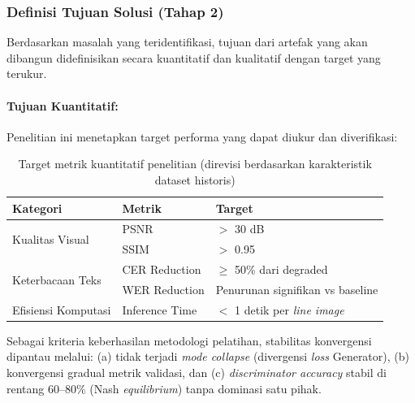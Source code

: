 \documentclass[12pt,a4paper]{article}
\begin{document}
\subsubsection{Definisi Tujuan Solusi (Tahap 2)}
Berdasarkan masalah yang teridentifikasi, tujuan dari artefak yang akan dibangun didefinisikan secara kuantitatif dan kualitatif dengan target yang terukur.

\paragraph{Tujuan Kuantitatif:}

Penelitian ini menetapkan target performa yang dapat diukur dan diverifikasi:

\begin{table}[H]
\centering
\caption{Target metrik kuantitatif penelitian (direvisi berdasarkan karakteristik dataset historis)}
\label{tab:target-metrik}
\small
\begin{tabular}{|l|l|l|}
\hline
Kategori & Metrik & Target \\ \hline
\multirow{2}{*}{Kualitas Visual} & PSNR & $>$ 30 dB \footnotemark[1] \\ \cline{2-3}
 & SSIM & $>$ 0.95 \\ \hline
\multirow{2}{*}{Keterbacaan Teks} & CER Reduction & $\geq$ 50\% dari degraded \footnotemark[2] \\ \cline{2-3}
 & WER Reduction & Penurunan signifikan vs baseline \\ \hline
Efisiensi Komputasi & Inference Time & $<$ 1 detik per \textit{line image} \\ \hline
\end{tabular}
\end{table}


Sebagai kriteria keberhasilan metodologi pelatihan, stabilitas konvergensi dipantau melalui: (a) tidak terjadi \textit{mode collapse} (divergensi \textit{loss} Generator), (b) konvergensi gradual metrik validasi, dan (c) \textit{discriminator accuracy} stabil di rentang 60--80\% (Nash \textit{equilibrium}) tanpa dominasi satu pihak.
\end{document}
